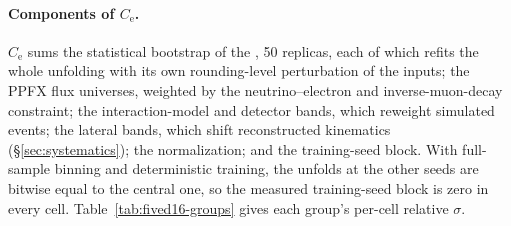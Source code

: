 \paragraph{Components of $C_{\mathrm{e}}$.} $C_{\mathrm{e}}$ sums the statistical bootstrap of the \estMultiD{}, 50 replicas, each of which refits the whole unfolding with its own rounding-level perturbation of the inputs; the PPFX flux universes, weighted by the neutrino--electron and inverse-muon-decay constraint; the interaction-model and detector bands, which reweight simulated events; the lateral bands, which shift reconstructed kinematics (\S\ref{sec:systematics}); the normalization; and the training-seed block. With full-sample binning and deterministic training, the unfolds at the other seeds are bitwise equal to the central one, so the measured training-seed block is zero in every cell. Table~\ref{tab:fived16-groups} gives each group's per-cell relative $\sigma$.

